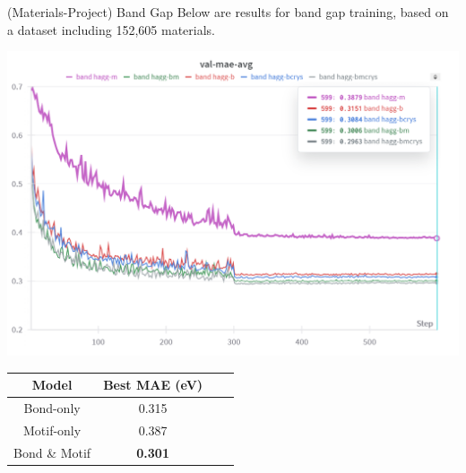 \documentclass[11pt]{beamer}
\begin{document}
\begin{frame}{(Materials-Project) Band Gap}
Below are results for band gap training, based on a dataset including 152,605 materials.
\begin{center}\small
\includegraphics[scale=0.4]{band_gap.png}

\medskip

\begin{tabular}{c|ccc}
Model & Best MAE (eV)  \\
\hline
Bond-only & 0.315 \\
Motif-only & 0.387  \\
Bond \& Motif & \textbf{0.301 }\\
\end{tabular}
\end{center}
\end{frame}
\end{document}
